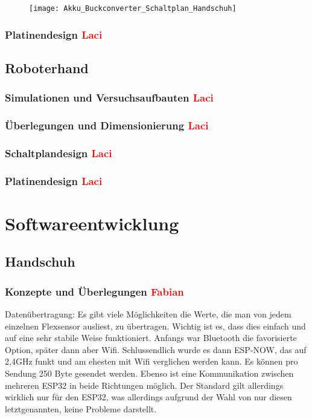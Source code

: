 \documentclass[11pt]{article}
\begin{document}
\begin{figure}[H]
	\begin{center}
		\scalebox{0.5}
		{\texttt{[image: Akku\_Buckconverter\_Schaltplan\_Handschuh]}}
	\end{center}
\end{figure}

\subsubsection{Platinendesign \textcolor{red}{Laci}}

\subsection{Roboterhand}
\subsubsection{Simulationen und Versuchsaufbauten \textcolor{red}{Laci}}
\subsubsection{Überlegungen und Dimensionierung \textcolor{red}{Laci}}
\subsubsection{Schaltplandesign \textcolor{red}{Laci}}
\subsubsection{Platinendesign \textcolor{red}{Laci}}


\section{Softwareentwicklung}

\subsection{Handschuh}
\subsubsection{Konzepte und Überlegungen \textcolor{red}{Fabian}}
Datenübertragung:
Es gibt viele Möglichkeiten die Werte, die man von jedem einzelnen Flexsensor ausliest, zu übertragen. Wichtig ist es, dass 
dies einfach und auf eine sehr stabile Weise funktioniert. Anfangs war Bluetooth die favorisierte Option, später dann aber Wifi. 
Schlussendlich wurde es dann ESP-NOW, das auf 2,4GHz funkt und am ehesten mit Wifi verglichen werden kann. Es können pro 
Sendung 250 Byte gesendet werden. Ebenso ist eine Kommunikation zwischen mehreren ESP32 in beide Richtungen möglich. Der 
Standard gilt allerdings wirklich nur für den ESP32, was allerdings aufgrund der Wahl von nur diesen letztgenannten, keine 
Probleme darstellt.
\end{document}
